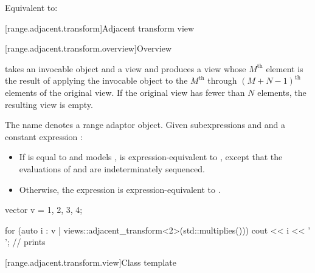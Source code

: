 \begin{itemdescr}
\pnum
\effects
Equivalent to: 
\end{itemdescr}

[range.adjacent.transform]{Adjacent transform view}

[range.adjacent.transform.overview]{Overview}

\pnum
{}%
 takes an invocable object and
a view and produces a view
whose $M^\text{th}$ element is the result of applying the invocable object
to the $M^\text{th}$ through $(M + N - 1)^\text{th}$ elements
of the original view.
If the original view has fewer than $N$ elements, the resulting view is empty.

\pnum
{}%
The name  denotes
a range adaptor object.
Given subexpressions  and  and
a constant expression :
\begin{itemize}
\item
If  is equal to  and
 models ,
 is expression-equivalent to
,
except that the evaluations of  and  are
indeterminately sequenced.
\item
Otherwise,
the expression  is
expression-equivalent to
.
\end{itemize}

\pnum
\begin{example}
\begin{codeblock}
vector v = {1, 2, 3, 4};

for (auto i : v | views::adjacent_transform<2>(std::multiplies())) {
  cout << i << ' ';     // prints 
}
\end{codeblock}
\end{example}

[range.adjacent.transform.view]{Class template }

